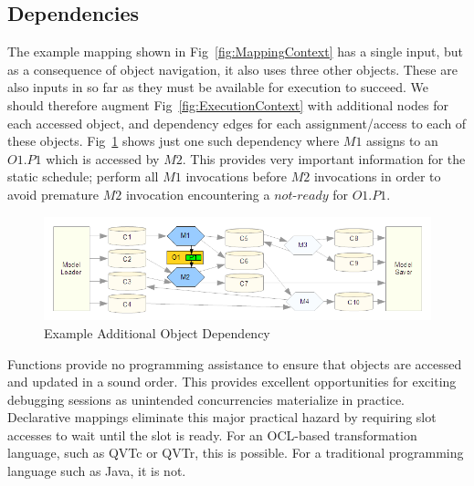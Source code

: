 \documentclass{llncs}
\begin{document}
\subsection{Dependencies}

The example mapping shown in Fig~\ref{fig:MappingContext} has a single input, but as a consequence of object navigation, it also uses three other objects. These are also inputs in so far as they must be available for execution to succeed. We should therefore augment Fig~\ref{fig:ExecutionContext} with additional nodes for each accessed object, and dependency edges for each assignment/access to each of these objects. Fig~\ref{fig:ObjectContext} shows just one such dependency where $M1$ assigns to an $O1.P1$ which is accessed by $M2$. This provides very important information for the static schedule; perform all $M1$ invocations before $M2$ invocations in order to avoid premature $M2$ invocation encountering a $not$-$ready$ for $O1.P1$.


\begin{figure}
  \begin{center}
    \includegraphics[width=4.75in]{ObjectContext.png}
  \end{center}
  \caption{Example Additional Object Dependency}
  \label{fig:ObjectContext}
\end{figure}

Functions provide no programming assistance to ensure that objects are accessed and updated in a sound order. This provides excellent opportunities for exciting debugging sessions as unintended concurrencies materialize in practice. Declarative mappings eliminate this major practical hazard by requiring slot accesses to wait until the slot is ready. For an OCL-based transformation language, such as QVTc or QVTr, this is possible. For a traditional programming language such as Java, it is not.

\end{document}
